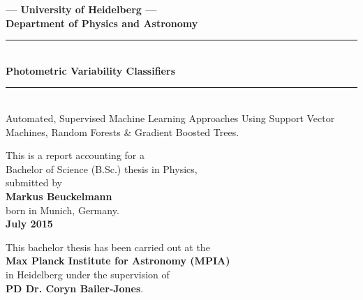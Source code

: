 \begin{titlepage}
\begin{center}

\Large\textbf{--- University of Heidelberg ---\\Department of Physics and Astronomy}

\vspace*{1.5cm}

\rule{\linewidth}{0.8pt}\\
\vspace{.5cm}
\Huge\textbf{Photometric Variability Classifiers}
\rule{\linewidth}{0.8pt}\\
\vspace{1cm}
\large{Automated, Supervised Machine Learning Approaches Using Support Vector Machines, Random Forests \& Gradient Boosted Trees.}

\vspace{4cm}

\normalsize
This is a report accounting for a\\
Bachelor of Science (B.Sc.) thesis in Physics,\\
submitted by\\
\vspace{0.2cm}
\Large\textbf{Markus Beuckelmann}\\
\normalsize
\vspace{0.2cm}
born in Munich, Germany.\\
\vspace{0.5cm}
\Large\textbf{July 2015}
\normalsize

\vspace*{3.25cm}

\normalsize
This bachelor thesis has been carried out at the\\
\textbf{Max Planck Institute for Astronomy (MPIA)}\\ in Heidelberg
under the supervision of\\
\textbf{PD Dr. Coryn Bailer-Jones}.

\end{center}

\end{titlepage}
